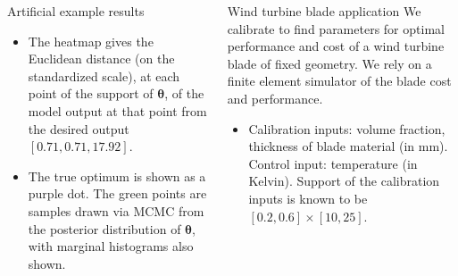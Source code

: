 \documentclass[final]{beamer}
\newlength{\onecolwid}
\newlength{\twocolwid}
\begin{document}
\begin{frame}[t]
\begin{columns}[t]
\begin{column}{\twocolwid}
\begin{columns}[t,totalwidth=\twocolwid]
\begin{column}{\onecolwid}
\begin{alertblock}{Artificial example results}
\begin{itemize}
\item 
The heatmap gives the Euclidean distance (on the standardized scale), at each point of the support of $\boldsymbol \theta$, of the model output at that point from the desired output $[0.71, 0.71, 17.92]$. 

\item The true optimum is shown as a purple dot. The green points are samples drawn via MCMC from the posterior distribution of $\boldsymbol\theta$, with marginal histograms also shown.
\end{itemize}



\end{alertblock}



\end{column} %

\begin{column}{\onecolwid}\vspace{-.6in} %


\begin{alertblock}{Wind turbine blade application}
We calibrate to find parameters for optimal performance and cost of a wind turbine blade of fixed geometry. We rely on a finite element simulator of the blade cost and performance.

\begin{figure}[h!]
\label{blade}
\end{figure}

\vspace{-10mm}
\begin{itemize}
\item Calibration inputs: volume fraction, thickness of blade material (in mm). Control input: temperature (in Kelvin). Support of the calibration inputs is known to be $[0.2,0.6]\times[10,25]$.


\end{itemize}
\end{alertblock}
\end{column}
\end{columns}
\end{column}
\end{columns}
\end{frame}
\end{document}
